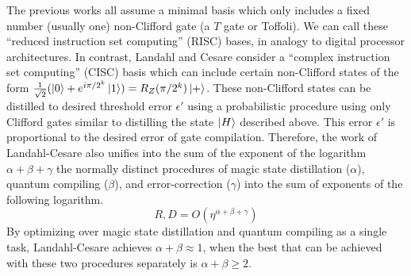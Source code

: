 The previous works all assume a minimal basis which only includes a fixed
number (usually one) non-Clifford gate (a $T$ gate or Toffoli). We can
call these ``reduced instruction set computing'' (RISC) bases, in analogy to
digital processor architectures.
In contrast, Landahl and
Cesare consider a ``complex instruction set computing'' (CISC) basis
\cite{Landahl2013b}
which
can include certain non-Clifford states of the form
$\frac{1}{\sqrt{2}} (\left\vert{0}\right\rangle + e^{i\pi / 2^k} \left\vert{1}\right\rangle ) = R_Z(\pi/{2^k})\left\vert{+}\right\rangle$. These
non-Clifford states can be distilled to desired threshold error $\epsilon'$ using
a probabilistic procedure using only Clifford gates similar to distilling
the state $\left\vert{H}\right\rangle$ described above. This error $\epsilon'$ is proportional
to the desired error of gate compilation.%
Therefore, the work of Landahl-Cesare also unifies into the sum of the 
exponent of the logarithm $\alpha + \beta + \gamma$ the
normally distinct procedures of
magic state distillation ($\alpha$),
quantum compiling ($\beta$),
and error-correction ($\gamma$) into
the sum of exponents of the following logarithm.
%
\begin{equation}
R,D = O(\eta ^{\alpha + \beta + \gamma})
\end{equation}
%
By optimizing over magic state distillation and quantum compiling as a
single task, Landahl-Cesare achieves $\alpha + \beta \approx 1$, when the
best that can be achieved with these two procedures separately is
$\alpha + \beta \ge 2$.


